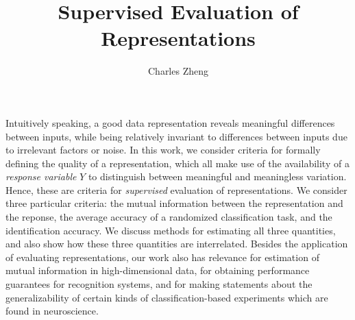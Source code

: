 \documentclass[12pt]{report}
\title{Supervised Evaluation of Representations}
\author{Charles Zheng}
\begin{document}

    \beforepreface


     Intuitively speaking, a good data
    representation reveals meaningful differences between inputs,
    while being relatively invariant to differences between inputs due
    to irrelevant factors or noise.  In this work, we consider criteria
    for formally defining the quality of a representation, which all
    make use of the availability of a \emph{response variable} $Y$ to
    distinguish between meaningful and meaningless variation.  Hence,
    these are criteria for \emph{supervised} evaluation of
    representations.  We consider three particular criteria: the mutual
    information between the representation and the reponse, the
    average accuracy of a randomized classification task, and the
    identification accuracy.  We discuss methods for estimating all
    three quantities, and also show how these three quantities are
    interrelated.  Besides the application of evaluating
    representations, our work also has relevance for estimation of
    mutual information in high-dimensional data, for obtaining
    performance guarantees for recognition systems, and for making
    statements about the generalizability of certain kinds of
    classification-based experiments which are found in neuroscience.

\newpage

\end{document}
